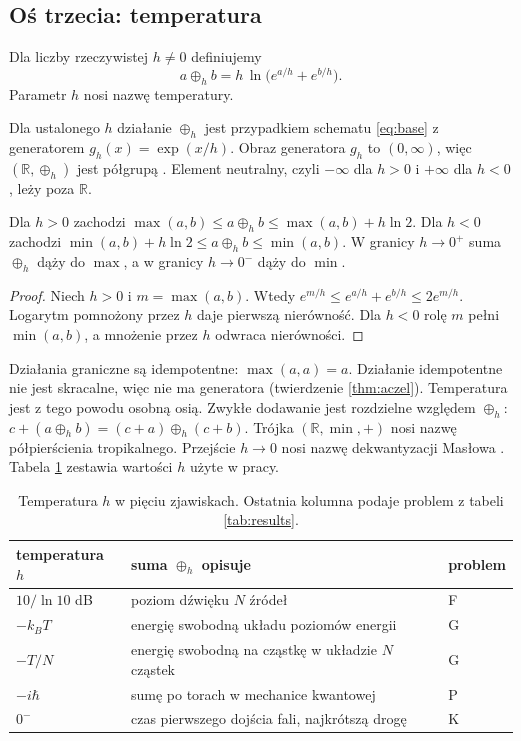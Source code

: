\documentclass[11pt,a4paper]{article}
\newcommand{\oph}{\mathbin{\oplus_{h}}}       %
\begin{document}
\subsection{Oś trzecia: temperatura}

\begin{definition}
\label{def:thermal}
Dla liczby rzeczywistej $h\neq0$ definiujemy
\[
a\oph b=h\,\ln\!\big(e^{a/h}+e^{b/h}\big).
\]
Parametr $h$ nosi nazwę temperatury.
\end{definition}

Dla ustalonego $h$ działanie $\oph$ jest przypadkiem schematu \eqref{eq:base}
z generatorem $g_{h}(x)=\exp(x/h)$. Obraz generatora $g_{h}$ to $(0,\infty)$,
więc $(\mathbb{R},\oph)$ jest półgrupą \cite{szulia2026}. Element neutralny,
czyli $-\infty$ dla $h>0$ i $+\infty$ dla $h<0$, leży poza $\mathbb{R}$.

\begin{proposition}
\label{prop:limit}
Dla $h>0$ zachodzi $\max(a,b)\le a\oph b\le\max(a,b)+h\ln2$.
Dla $h<0$ zachodzi $\min(a,b)+h\ln2\le a\oph b\le\min(a,b)$.
W granicy $h\to0^{+}$ suma $\oph$ dąży do $\max$, a w granicy $h\to0^{-}$
dąży do $\min$.
\end{proposition}

\begin{proof}
Niech $h>0$ i $m=\max(a,b)$. Wtedy $e^{m/h}\le e^{a/h}+e^{b/h}\le2e^{m/h}$.
Logarytm pomnożony przez $h$ daje pierwszą nierówność. Dla $h<0$ rolę $m$
pełni $\min(a,b)$, a mnożenie przez $h$ odwraca nierówności.
\end{proof}

Działania graniczne są idempotentne: $\max(a,a)=a$. Działanie idempotentne nie
jest skracalne, więc nie ma generatora (twierdzenie \ref{thm:aczel}).
Temperatura jest z tego powodu osobną osią. Zwykłe dodawanie jest rozdzielne
względem $\oph$: $c+(a\oph b)=(c+a)\oph(c+b)$. Trójka $(\mathbb{R},\min,+)$
nosi nazwę półpierścienia tropikalnego. Przejście $h\to0$ nosi nazwę
dekwantyzacji Masłowa \cite{litvinov2007}. Tabela \ref{tab:h} zestawia wartości
$h$ użyte w pracy.

\begin{table}[t]
\centering
\small
\caption{Temperatura $h$ w pięciu zjawiskach. Ostatnia kolumna podaje problem
z tabeli \ref{tab:results}.}
\label{tab:h}
\begin{tabular}{@{}lll@{}}
\toprule
\textbf{temperatura $h$} & \textbf{suma $\oph$ opisuje} & \textbf{problem} \\
\midrule
$10/\ln10$ dB & poziom dźwięku $N$ źródeł & F \\
$-k_{B}T$ & energię swobodną układu poziomów energii & G \\
$-T/N$ & energię swobodną na cząstkę w układzie $N$ cząstek & G \\
$-i\hbar$ & sumę po torach w mechanice kwantowej & P \\
$0^{-}$ & czas pierwszego dojścia fali, najkrótszą drogę & K \\
\bottomrule
\end{tabular}
\end{table}
\end{document}
